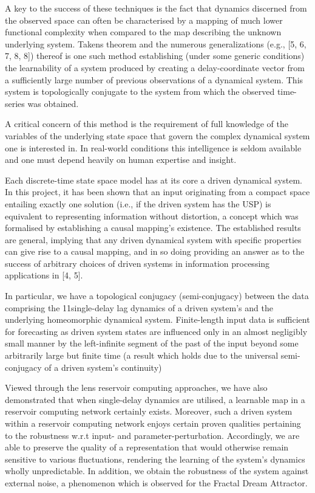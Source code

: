 \documentclass[a4paper,12pt,twoside]{report}
\begin{document}
A key to the success of these techniques is the fact that dynamics discerned from the observed space can often be characterised by a mapping of much lower functional complexity when compared to the map describing the unknown underlying system. Takens theorem and the numerous generalizations (e.g., [5, 6, 7, 8, 8]) thereof is one such method establishing (under some generic conditions) the learnability of a system produced by creating a delay-coordinate vector from a sufficiently large number of previous observations of a dynamical system. This system is topologically conjugate to the system from which the observed time-series was obtained.

A critical concern of this method is the requirement of full knowledge of the variables of the underlying state space that govern the complex dynamical system one is interested in. In real-world conditions this intelligence is seldom available and one must depend heavily on human expertise and insight. 

Each discrete-time state space model has at its core a driven dynamical system. In this project, it has been shown that an input originating from a compact space entailing exactly one solution (i.e., if the driven system has the USP) is equivalent to representing information without distortion, a concept which was formalised by establishing a causal mapping’s existence. The established results are general, implying that any driven dynamical system with specific properties can give rise to a causal mapping, and in so doing  providing an answer as to the success of arbitrary choices of driven systems in information processing applications in [4, 5].

In particular, we have a topological conjugacy (semi-conjugacy) between the data comprising the 11single-delay lag dynamics of a driven system’s and the underlying homeomorphic dynamical system. Finite-length input data is sufficient for forecasting as driven system states are influenced only in an almost negligibly small manner by the left-infinite segment of the past of the input beyond some arbitrarily large but finite time (a result which holds due to the universal semi-conjugacy of a driven system’s continuity)


Viewed through the lens reservoir computing approaches, we have also demonstrated that when single-delay dynamics are utilised, a learnable map in a reservoir computing network certainly exists. Moreover, such a driven system within a reservoir computing network enjoys certain proven qualities pertaining to the robustness w.r.t input- and parameter-perturbation. Accordingly, we are able to preserve the quality of a representation that would otherwise remain sensitive to various fluctuations, rendering the learning of the system’s dynamics wholly unpredictable. In addition, we obtain the robustness of the system against external noise, a phenomenon which is observed for the Fractal Dream Attractor.
\end{document}
